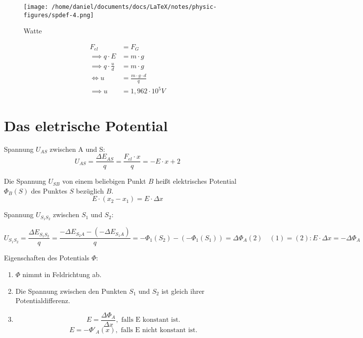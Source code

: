 \documentclass[a4paper]{report}
\begin{document}
\begin{figure}
  \begin{center}
    \texttt{[image: /home/daniel/documents/docs/LaTeX/notes/physic-figures/spdef-4.png]}
  \end{center}
  \caption{Watte}
  \label{fig:watte1}
\end{figure}



\begin{align*}
  F_{el}&=F_G\\
  \implies q\cdot E&=m\cdot g\\
  \implies q\cdot \frac{u}{d} &= m\cdot g\\
  \Leftrightarrow u&=\frac{m\cdot g \cdot d}{q}\\
  \implies u&=1,962\cdot 10^5V
\end{align*}



\section{Das eletrische Potential}


Spannung $U_{AS}$ zwischen A und S:\\
\[U_{AS}=\frac{\Delta E_{AS}}{q}=\frac{F_{el}\cdot x}{q}=-E\cdot x +2\]


\begin{tcolorbox}[colback=yellow!10!white,colframe=yellow!80!black]

Die Spannung $U_{SB}$ von einem beliebigen Punkt $B$ heißt elektrisches
Potential $\Phi_B(S)$ des Punktes $S$ bezüglich $B$.
\[E \cdot (x_2 - x_1) = E\cdot \Delta x \]

Spannung $U_{S_1S_2}$ zwischen $S_1$ und $S_2$:

\[U_{S_1S_2}= \frac{\Delta E_{S_1S_2}}{q}=\frac{-\Delta E_{S_2A}-(-\Delta
E_{S_1A})}{q}=-\Phi_1(S_2)-(-\Phi_1(S_1))=\Delta\Phi_A(2) \quad (1)=(2):E \cdot
\Delta x=-\Delta\Phi_A\]

Eigenschaften des Potentials $\Phi$:
  \begin{enumerate}
    \item $\Phi$ nimmt in Feldrichtung ab.
    \item Die Spannung zwischen den Punkten $S_1$ und $S_2$ ist gleich ihrer Potentialdifferenz.
    \item \[E=\frac{\Delta\Phi_A}{\Delta x}, \text{ falls E konstant ist.}\]
    \[E=-\Phi'_A(x), \text{ falls E nicht konstant ist.}\]
  \end{enumerate}
\end{tcolorbox}
\end{document}
